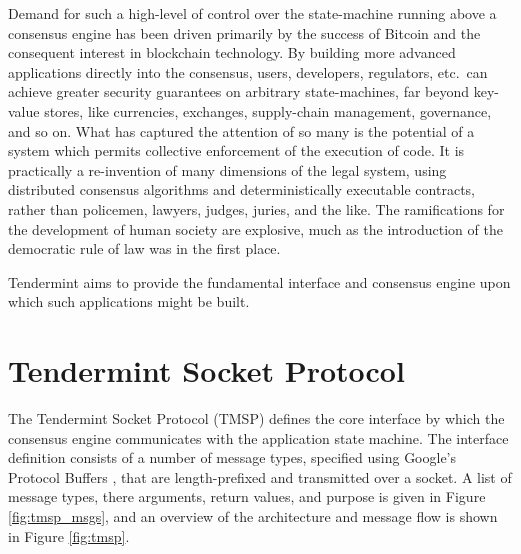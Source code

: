 Demand for such a high-level of control over the state-machine running above a consensus engine has been driven primarily by the success of Bitcoin and the consequent interest in blockchain technology.
By building more advanced applications directly into the consensus, 
users, developers, regulators, etc.~can achieve greater security guarantees on arbitrary state-machines, 
far beyond key-value stores, like currencies, exchanges, supply-chain management, governance, and so on.
What has captured the attention of so many is the potential of a system which permits collective enforcement of the execution of code.
It is practically a re-invention of many dimensions of the legal system, using distributed consensus algorithms and deterministically executable contracts,
rather than policemen, lawyers, judges, juries, and the like.
The ramifications for the development of human society are explosive, much as the introduction of the democratic rule of law was in the first place.

Tendermint aims to provide the fundamental interface and consensus engine upon which such applications might be built.

\section{Tendermint Socket Protocol}

The Tendermint Socket Protocol (TMSP) defines the core interface by which the consensus engine communicates with the application state machine.
The interface definition consists of a number of message types, specified using Google's Protocol Buffers \cite{protobuf}, 
that are length-prefixed and transmitted over a socket. 
A list of message types, there arguments, return values, and purpose is given in Figure \ref{fig:tmsp_msgs},
and an overview of the architecture and message flow is shown in Figure \ref{fig:tmsp}.

